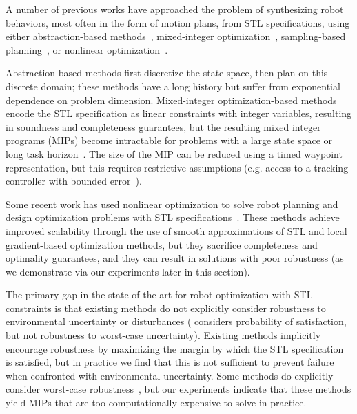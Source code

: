 A number of previous works have approached the problem of synthesizing robot behaviors, most often in the form of motion plans, from STL specifications, using either abstraction-based methods~\cite{plakuMotionPlanningTemporallogic2016}, mixed-integer optimization~\cite{sunMultiagentMotionPlanning2022,yangSynthesisguidedAdversarialScenario2021}, sampling-based planning~\cite{kantaros20,vasile17}, or nonlinear optimization~\cite{pantFlybyLogicControlMultiDrone2018,pantazidesSatelliteMissionPlanning2022,leungBackPropagationSignalTemporal2021}.

Abstraction-based methods first discretize the state space, then plan on this discrete domain; these methods have a long history but suffer from exponential dependence on problem dimension. Mixed-integer optimization-based methods encode the STL specification as linear constraints with integer variables, resulting in soundness and completeness guarantees, but the resulting mixed integer programs (MIPs) become intractable for problems with a large state space or long task horizon~\cite{sadraddiniRobustTemporalLogic2016,yangSynthesisguidedAdversarialScenario2021,raman15}. The size of the MIP can be reduced using a timed waypoint representation, but this requires restrictive assumptions (e.g. access to a tracking controller with bounded error~\cite{sunMultiagentMotionPlanning2022}).

Some recent work has used nonlinear optimization to solve robot planning and design optimization problems with STL specifications~\cite{pantSmoothOperatorControl2017,pantazidesSatelliteMissionPlanning2022,leungBackPropagationSignalTemporal2021,takanoContinuousOptimizationBasedTask2021,leeSignalTemporalLogic2021}. These methods achieve improved scalability through the use of smooth approximations of STL and local gradient-based optimization methods, but they sacrifice completeness and optimality guarantees, and they can result in solutions with poor robustness (as we demonstrate via our experiments later in this section).

The primary gap in the state-of-the-art for robot optimization with STL constraints is that existing methods do not explicitly consider robustness to environmental uncertainty or disturbances (\cite{leeSignalTemporalLogic2021} considers probability of satisfaction, but not robustness to worst-case uncertainty). Existing methods implicitly encourage robustness by maximizing the margin by which the STL specification is satisfied, but in practice we find that this is not sufficient to prevent failure when confronted with environmental uncertainty. Some methods do explicitly consider worst-case robustness~\cite{raman15}, but our experiments indicate that these methods yield MIPs that are too computationally expensive to solve in practice.

